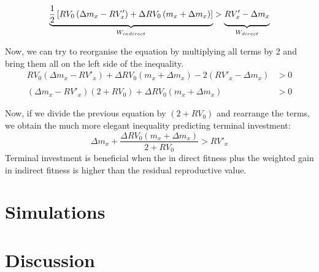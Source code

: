 \documentclass[12pt,review,authoryear]{elsarticle}
\begin{document}
\begin{equation} \label{eq:tiws}
	\def\tallest{\vphantom{\frac{RV_x}{1}}}
	\underbrace{ \frac{1}{2} \left[ RV_0 \left( \Delta m_x - RV'_{x} \right) + \Delta RV_{0} \left(m_x + \Delta m_{x}\right)\right]}_{W_{indirect}} >
	\underbrace { RV'_{x} - \Delta m_{x} \tallest }_{W_{direct}}
\end{equation}

Now, we can try to reorganise the equation by multiplying all terms by 2 and bring them all on the left side of the inequality.
\begin{equation} \label{eq:tiwss}
	\begin{split}
		RV_0 \left( \Delta m_x - RV'_{x} \right) + \Delta RV_{0} \left(m_x + \Delta m_{x}\right) - 2 \left(RV'_{x} - \Delta m_{x}
		\right)
		& > 0
		\\ \\
		\left( \Delta m_x - RV'_{x} \right) \left( 2 + RV_0 \right) + \Delta RV_{0} \left(m_x + \Delta m_{x}\right)
		& > 0
	\end{split}
\end{equation}

Now, if we divide the previous equation by $(2 + RV_0)$ and rearrange the terms, we obtain the much more elegant inequality predicting terminal investment:
\begin{equation} \label{eq:tiwid}
	\Delta m_x  + \frac{ \Delta RV_{0} \left(m_x + \Delta m_{x}\right)}{ 2 + RV_0 }
	> RV'_{x}
\end{equation}
Terminal investment is beneficial when the in direct fitness plus the weighted gain in indirect fitness is higher than the residual reproductive value.




\section{Simulations}




\section{Discussion}
\end{document}
